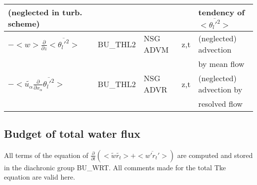 \begin{center}
\begin{tabular}{||p{5cm}|>{\centering}p{2cm}|>{\centering}p{2.5cm}|>{\centering}p{0.5cm}|p{5.5cm }||}
(neglected in turb. scheme) & & & &tendency of $<\overline{\theta_l'^2}>$ \\
\hline
$-<w>\frac{\partial}{\partial z}<\overline{\theta_l'^2}>$  & BU\_THL2 & NSG ADVM & z,t & (neglected) advection \\
 & & & & by mean flow\\
\hline
$-<\tilde{u_\alpha}\frac{\partial}{\partial x_\alpha}\overline{\theta_l'^2}>$  & BU\_THL2 & NSG ADVR & z,t & (neglected) advection by\\
 & & & &resolved flow\\
\hline
\hline
\end{tabular}
\end{center}
\newpage
\subsection{Budget of total water flux}


All terms of the equation of $\frac{\partial}{\partial t} (<\tilde{w}\tilde{r_t}> + <\overline{w'r_t'}>)$ are
computed and stored in the diachronic group BU\_WRT. 
All comments made for the total Tke equation are valid here.\\

